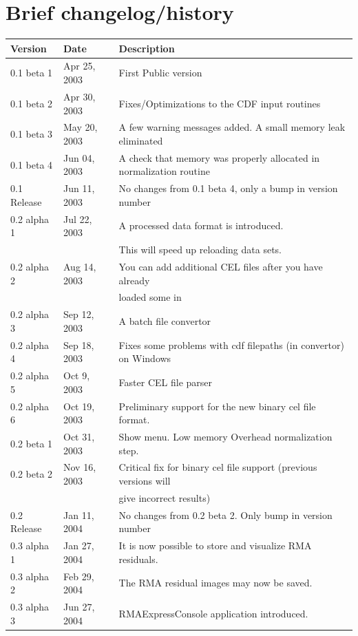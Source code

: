\documentclass[11pt]{report}
\begin{document}
\chapter{Brief changelog/history}

{\small \begin{tabular}{lll} \hline
Version	& Date	 & Description \\\hline
0.1 beta 1 &	Apr 25, 2003&	First Public version \\
0.1 beta 2 &	Apr 30, 2003&	Fixes/Optimizations to the CDF input routines\\
0.1 beta 3 &	May 20, 2003&	A few warning messages added. A small memory leak eliminated\\
0.1 beta 4 &	Jun 04, 2003&	A check that memory was properly allocated in normalization routine\\
0.1 Release&	Jun 11, 2003&	No changes from 0.1 beta 4, only a bump in version number\\
0.2 alpha 1&	Jul 22, 2003&	A processed data format is introduced.\\
&& This will speed up reloading data sets.\\
0.2 alpha 2&	Aug 14, 2003&	You can add additional CEL files after you have already \\
&& loaded some in\\
0.2 alpha 3&	Sep 12, 2003&	A batch file convertor \\
0.2 alpha 4&	Sep 18, 2003&	Fixes some problems with cdf filepaths (in convertor) on Windows \\
0.2 alpha 5&	Oct 9, 2003&	Faster CEL file parser \\
0.2 alpha 6&	Oct 19, 2003&	Preliminary support for the new binary cel file format. \\
0.2 beta 1&	Oct 31, 2003&	Show menu. Low memory Overhead normalization step. \\
0.2 beta 2&	Nov 16, 2003&	Critical fix for binary cel file support (previous versions will \\
&&  give incorrect results) \\
0.2 Release&	Jan 11, 2004&	No changes from 0.2 beta 2. Only bump in version number\\
0.3 alpha 1&	Jan 27, 2004&	It is now possible to store and visualize RMA residuals. \\
0.3 alpha 2&	Feb 29, 2004&	The RMA residual images may now be saved. \\
0.3 alpha 3&	Jun 27, 2004&	RMAExpressConsole application introduced. \\

\end{tabular}}
\end{document}
